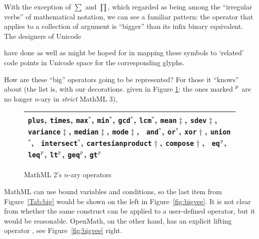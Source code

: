 \documentclass{llncs}
\begin{document}
With the exception of $\sum$ and $\prod$, which \cite{Davenportminor2008}
regarded as being among the ``irregular verbs'' of mathematical notation, we can see a
familiar pattern: the operator that applies to a collection of argument is
``bigger'' than its infix binary equivalent. The designers of
Unicode{
have done as well as might be hoped for in mapping these symbols to `related'
code points in Unicode space for the corresponding glyphs.

How are these ``big'' operators going to be represented?  For those it ``knows'' about
\cite[4.2.3.2]{WorldWideWebConsortium2003b} (the list is, with our decorations. given in
Figure \ref{fig:MMLnary}: the ones marked ${}^\P$ are no longer $n$-ary in {\emph{strict}}
MathML 3), 
\begin{figure}\vspace*{-1.5em}\centering
  \begin{tabular}{p{11cm}}\hline
{\tt plus}, {\tt times}, {\tt max}${}^*$, {\tt min}${}^*$, {\tt gcd}${}^*$,
{\tt lcm}${}^*$, {\tt mean}${}\ddag$, {\tt sdev}${}\ddag$, {\tt
variance}${}\ddag$, {\tt median}${}\ddag$, {\tt mode}${}\ddag$, {\tt
and}${}^*$, {\tt or}${}^*$, {\tt xor}${}\dag$, {\tt union}${}^*$, {\tt
intersect}${}^*$, {\tt cartesianproduct}${}\dag$, {\tt compose}${}\dag$, {\tt
eq}${}^\P$, {\tt leq}${}^\P$,
{\tt lt}${}^\P$, {\tt geq}${}^\P$, {\tt gt}${}^\P$\\\hline
\end{tabular}
\vspace*{-.5em}
\caption{MathML 2's $n$-ary operators}\label{fig:MMLnary}\vspace*{-1.5em}
\end{figure}
MathML can use bound variables and conditions, so the last item from Figure~\ref{Tab:big}
would be shown on the left in Figure~\ref{fig:bigvee}. It is not clear from
\cite{WorldWideWebConsortium2003b} whether the same construct can be applied to a
user-defined operator, but it would be reasonable. OpenMath, on the other hand,
has an explicit lifting operator {},
see Figure~\ref{fig:bigvee} right.

}
\end{document}

